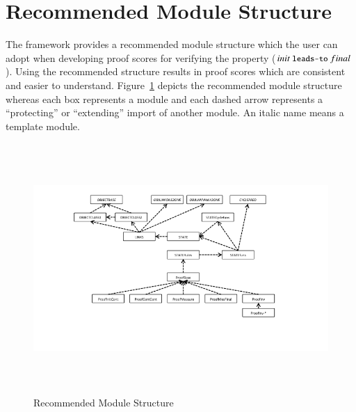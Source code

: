 \documentclass[12pt]{report}
\newcommand{\mbstt}[1]{\mbox{\small{\tt {#1}}}}
\begin{document}
\section{Recommended Module Structure}
The framework provides a recommended module structure which the user
can adopt when developing proof scores for verifying the property
($init~\mbstt{leads-to}~final$). Using the recommended structure
results in proof scores which are consistent and easier to understand.
Figure~\ref{fig:modules} depicts the recommended module structure
whereas each box represents a module and each dashed arrow represents
a ``protecting'' or ``extending'' import of another module. An italic
name means a template module.

\begin{figure}
\centering
\includegraphics[height=9.5cm,natwidth=720,natheight=405,clip,trim=90 80 130 20]{modules.png}
\caption{Recommended Module Structure}
\label{fig:modules}
\end{figure}
\end{document}
